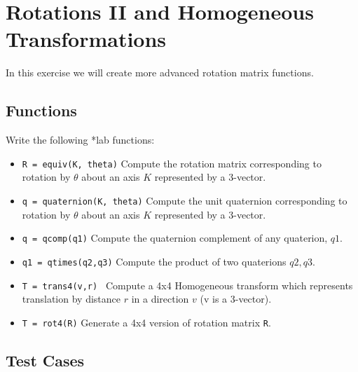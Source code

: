 \documentclass{article}
\begin{document}
\newpage
\section{Rotations II and Homogeneous Transformations}

In this exercise we will create more advanced rotation matrix functions.

\subsection{Functions}
Write the following *lab functions:

\begin{itemize}
  \item {\tt R = equiv(K, theta)}  	Compute the rotation matrix corresponding to rotation by $\theta$ about an axis $K$ represented by a 3-vector.
  \item {\tt q = quaternion(K, theta)}  Compute the unit quaternion corresponding to rotation by $\theta$ about an axis $K$ represented by a 3-vector.
  \item {\tt q = qcomp(q1)} 		Compute the quaternion complement of any quaterion, $q1$.
  \item {\tt q1 = qtimes(q2,q3)} 	Compute the product of two quaterions $q2,q3$.
  \item {\tt T = trans4(v,r) }		Compute a 4x4 Homogeneous transform which represents translation by distance $r$ in a direction $v$ (v is a 3-vector).
  \item {\tt T = rot4(R)}               Generate a 4x4 version of rotation matrix {\tt R}.
\end{itemize}



\subsection{Test Cases}
\end{document}
